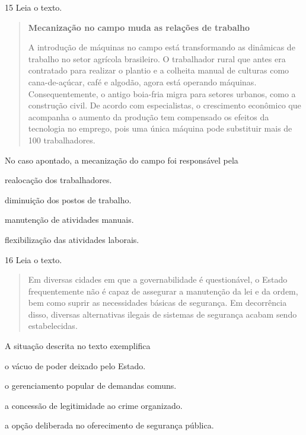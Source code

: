 \num{15} Leia o texto.
\enlargethispage{2\baselineskip}

\begin{quote}
\textbf{Mecanização no campo muda as relações de trabalho}

\noindent{}A introdução de máquinas no campo está transformando as dinâmicas de trabalho no setor agrícola brasileiro. O trabalhador rural que antes era contratado para realizar o plantio e a colheita manual de culturas como cana-de-açúcar, café e algodão, agora está operando máquinas. Consequentemente, o antigo boia-fria migra para setores urbanos, como a construção civil. De acordo com especialistas, o crescimento econômico que acompanha o aumento da produção tem compensado os efeitos da tecnologia no emprego, pois uma única máquina pode substituir mais de 100 trabalhadores.

\end{quote}

No caso apontado, a mecanização do campo foi responsável pela

\begin{escolha}
\item  realocação dos trabalhadores.

\item  diminuição dos postos de trabalho.

\item  manutenção de atividades manuais.

\item  flexibilização das atividades laborais.
\end{escolha}

\num{16} Leia o texto.

\begin{quote}
Em diversas cidades em que a governabilidade é questionável, o Estado frequentemente não é capaz de assegurar a manutenção da lei e da ordem, bem como suprir as necessidades básicas de segurança. Em decorrência disso, diversas alternativas ilegais de sistemas de segurança acabam sendo estabelecidas.

\end{quote}

A situação descrita no texto exemplifica

\begin{escolha}
\item  o vácuo de poder deixado pelo Estado.

\item  o gerenciamento popular de demandas comuns.

\item  a concessão de legitimidade ao crime organizado.

\item  a opção deliberada no oferecimento de segurança pública.
\end{escolha}

